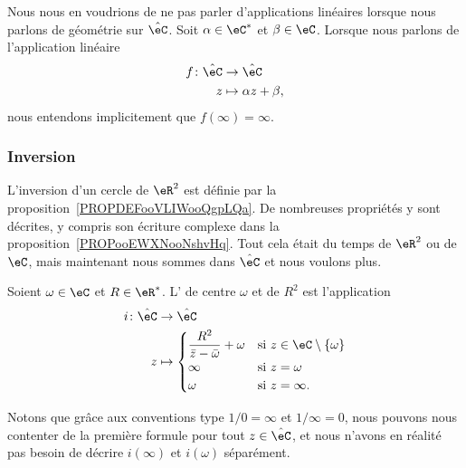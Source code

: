 Nous nous en voudrions de ne pas parler d'applications linéaires lorsque nous parlons de géométrie sur \( \hat \eC\). Soit \( \alpha\in \eC^*\) et \( \beta\in \eC\). Lorsque nous parlons de l'application linéaire
\begin{equation}
	\begin{aligned}
		f\colon \hat\eC & \to \hat\eC             \\
		z               & \mapsto \alpha z+\beta,
	\end{aligned}
\end{equation}
nous entendons implicitement que \( f(\infty)=\infty\).

\subsubsection{Inversion}
\label{SSUBSooPOUNooTPilbE}

L'inversion d'un cercle de \( \eR^2\) est définie par la proposition~\ref{PROPDEFooVLIWooQgpLQa}. De nombreuses propriétés y sont décrites, y compris son écriture complexe dans la proposition~\ref{PROPooEWXNooNshvHq}. Tout cela était du temps de \( \eR^2\) ou de \( \eC\), mais maintenant nous sommes dans \( \hat \eC\) et nous voulons plus.

\begin{definition}       \label{DEFooIUTZooWRaXts}
	Soient \( \omega\in \eC\) et \( R\in \eR^*\). L' de centre \( \omega\) et de  \( R^2\) est l'application
	\begin{equation}
		\begin{aligned}
			i\colon \hat \eC & \to \hat \eC                                                                                  \\
			z                & \mapsto \begin{cases}
				                           \dfrac{ R^2 }{ \bar z-\bar \omega }+\omega & \text{si } z\in \eC\setminus\{ \omega \} \\
				                           \infty                                     & \text{si } z=\omega                      \\
				                           \omega                                     & \text{si } z=\infty.
			                           \end{cases}
		\end{aligned}
	\end{equation}
\end{definition}
Notons que grâce aux conventions type \( 1/0=\infty\) et \( 1/\infty=0\), nous pouvons nous contenter de la première formule pour tout \( z\in \hat \eC\), et nous n'avons en réalité pas besoin de décrire \( i(\infty)\) et \( i(\omega)\) séparément.

